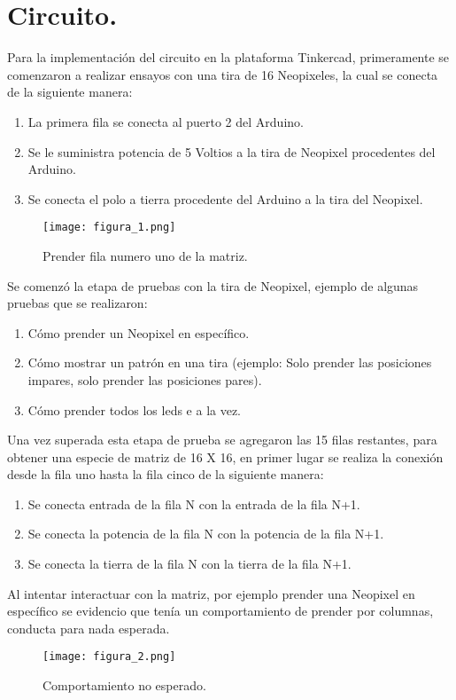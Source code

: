 \documentclass{article}
\begin{document}
\section{Circuito.} \label{circuito}
Para la implementación del circuito en la plataforma Tinkercad, primeramente se comenzaron a realizar ensayos con una tira de 16 Neopixeles, la cual se conecta de la siguiente manera:
\begin{enumerate}
  \item La primera fila se conecta al puerto 2 del Arduino.
  \item Se le suministra potencia de 5 Voltios a la tira de Neopixel procedentes del Arduino.
  \item Se conecta el polo a tierra procedente del Arduino a la tira del Neopixel.
\end{enumerate}
\begin{figure}[h]
  \texttt{[image: figura\_1.png]}
  \centering
  \caption{Prender fila numero uno de la matriz.}
  \label{fig:fila_uno}
\end{figure}
Se comenzó la etapa de pruebas con la tira de Neopixel, ejemplo de algunas pruebas que se realizaron:
\begin{enumerate}
    \item Cómo prender un Neopixel en específico.
    \item Cómo mostrar un patrón en una tira (ejemplo: Solo prender las posiciones impares, solo prender las posiciones pares).
    \item Cómo prender todos los leds e a la vez.
\end{enumerate}
Una vez superada esta etapa de prueba se agregaron las 15 filas restantes, para obtener una especie de matriz de 16 X 16, en primer lugar se realiza la conexión desde la fila uno hasta la fila cinco de la siguiente manera:
\begin{enumerate}
    \item Se conecta entrada de la fila N con la entrada de la fila N+1.
    \item Se conecta la potencia de la fila N con la potencia de la fila N+1.
    \item Se conecta la tierra de la fila N con la tierra de la fila N+1.
\end{enumerate}
Al intentar interactuar con la matriz, por ejemplo prender una Neopixel en específico se evidencio que tenía un comportamiento de prender por columnas, conducta para nada esperada.\\
\begin{figure}[h]
  \texttt{[image: figura\_2.png]}
  \centering
  \caption{Comportamiento no esperado.}
  \label{fig:por_columnas}
\end{figure}
\end{document}
